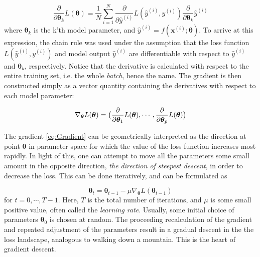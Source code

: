 \begin{equation}\label{eq:LossDerivateWRTparameter}
    \frac{\partial}{\partial \boldsymbol{\theta}_k} L(\boldsymbol{\theta}) =
    \frac{1}{N}\sum_{i=1}^{N} \frac{\partial}{\partial \hat{y}^{(i)}} L( \hat{y}^{(i)}, y^{(i)})
    \frac{\partial}{\partial \boldsymbol{\theta}_k}\hat{y}^{(i)}
\end{equation}
where $\boldsymbol{\theta}_k$ is the k'th model parameter, and  $\hat{y}^{(i)} = f(\boldsymbol{x}^{(i)}; \boldsymbol{\theta})$. To arrive at this expression, the chain rule was used under the assumption that the loss function $L(\hat{y}^{(i)}, y^{(i)})$ and model output $\hat{y}^{(i)}$ are differentiable with respect to $\hat{y}^{(i)}$ and $\boldsymbol{\theta}_k$, respectively. Notice that the derivative is calculated with respect to the entire training set, i.e. the whole \emph{batch}, hence the name. The gradient is then constructed simply as a vector quantity containing the derivatives with respect to each model parameter:

\begin{equation}\label{eq:Gradient}
    \nabla_{\boldsymbol{\theta}} L(\boldsymbol{\theta})= 
    \big{(} \frac{\partial}{\partial \boldsymbol{\theta}_1} L(\boldsymbol{\theta}), 
    \cdots, \frac{\partial}{\partial \boldsymbol{\theta}_p} L(\boldsymbol{\theta}) \big{)}
\end{equation}

The gradient \autoref{eq:Gradient} can be geometrically interpreted as the direction at point $\boldsymbol{\theta}$ in parameter space for which the value of the loss function increases most rapidly. In light of this, one can attempt to move all the parameters some small amount in the opposite direction, \emph{the direction of steepest descent}, in order to decrease the loss. This can be done iteratively, and can be formulated as 


\begin{equation}\label{eq:ParameterUpdate}
    \boldsymbol{\theta}_{t} = \boldsymbol{\theta}_{t-1} - \mu \nabla_{\boldsymbol{\theta}} L(\boldsymbol{\theta}_{t-1})
\end{equation}
for $t=0, \cdots, T-1$. Here, $T$ is the total number of iterations, and $\mu$ is some small positive value, often called the \emph{learning rate}. Usually, some initial choice of parameters $\boldsymbol{\theta}_{0}$ is chosen at random. The proceeding recalculation of the gradient and repeated adjustment of the parameters result in a gradual descent in the the loss landscape, analogous to walking down a mountain. This is the heart of gradient descent.

